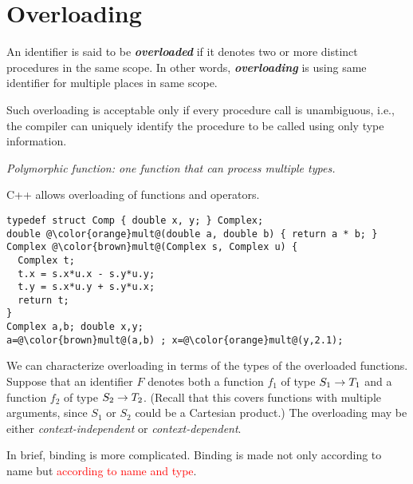 \section{Overloading}
\label{sec:overloading}

An identifier is said to be \textit{\textbf{overloaded}} if it denotes two or more distinct procedures in the same scope. In other words, \textit{\textbf{overloading}} is using same identifier for multiple places in same
scope.

Such overloading is acceptable only if every procedure call is unambiguous, i.e., the compiler can uniquely identify the procedure to be called using only type information.

\textit{Polymorphic function: one function that can process multiple types.}

C++ allows overloading of functions and operators.
\begin{listing}[H]
\begin{verbatim}
typedef struct Comp { double x, y; } Complex;
double @\color{orange}mult@(double a, double b) { return a * b; }
Complex @\color{brown}mult@(Complex s, Complex u) {
  Complex t;
  t.x = s.x*u.x - s.y*u.y;
  t.y = s.x*u.y + s.y*u.x;
  return t;
}
Complex a,b; double x,y;
a=@\color{brown}mult@(a,b) ; x=@\color{orange}mult@(y,2.1);
\end{verbatim}
\caption{}
\label{code:code3}
\end{listing}

We can characterize overloading in terms of the types of the overloaded functions. Suppose that an identifier $F$ denotes both a function $f_1$ of type $S_1 \rightarrow T_1$ and a function $f_2$ of type $S_2 \rightarrow T_2$. (Recall that this covers functions with multiple arguments, since $S_1$ or $S_2$ could be a Cartesian product.) The overloading may be either \textit{context-independent} or \textit{context-dependent}.

In brief, binding is more complicated. Binding is made not only according to name but \textcolor{red}{according to name and type}.

